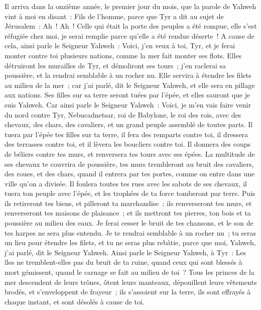\begin{multicols}{2}
\VerseOne{}Il arriva dans la onzième année, le premier jour du mois, que la parole de Yahweh vint à moi en disant~:
Fils de l'homme, parce que Tyr a dit au sujet de Jérusalem~: Ah~! Ah~! Celle qui était la porte des peuples a été rompue, elle s'est réfugiée chez moi, je serai remplie parce qu'elle a été rendue déserte~!
A cause de cela, ainsi parle le Seigneur Yahweh~: Voici, j'en veux à toi, Tyr, et je ferai monter contre toi plusieurs nations, comme la mer fait monter ses flots.
Elles détruiront les murailles de Tyr, et démoliront ses tours~; j'en raclerai sa poussière, et la rendrai semblable à un rocher nu.
Elle servira à étendre les filets au milieu de la mer~; car j'ai parlé, dit le Seigneur Yahweh, et elle sera en pillage aux nations.
Ses filles sur sa terre seront tuées par l'épée, et elles sauront que je suis Yahweh.
Car ainsi parle le Seigneur Yahweh~: Voici, je m'en vais faire venir du nord contre Tyr, Nebucadnetsar, roi de Babylone, le roi des rois, avec des chevaux, des chars, des cavaliers, et un grand peuple assemblé de toutes parts.
Il tuera par l'épée tes filles sur ta terre, il fera des remparts contre toi, il dressera des terrasses contre toi, et il lèvera les boucliers contre toi.
Il donnera des coups de béliers contre tes murs, et renversera tes tours avec ses épées.
La multitude de ses chevaux te couvrira de poussière, tes murs trembleront au bruit des cavaliers, des roues, et des chars, quand il entrera par tes portes, comme on entre dans une ville qu'on a divisée.
Il foulera toutes tes rues avec les sabots de ses chevaux, il tuera ton peuple avec l'épée, et les trophées de ta force tomberont par terre.
Puis ils retireront tes biens, et pilleront ta marchandise~; ils renverseront tes murs, et renverseront tes maisons de plaisance~; et ils mettront tes pierres, ton bois et ta poussière au milieu des eaux.
Je ferai cesser le bruit de tes chansons, et le son de tes harpes ne sera plus entendu.
Je te rendrai semblable à un rocher nu~; tu seras un lieu pour étendre les filets, et tu ne seras plus rebâtie, parce que moi, Yahweh, j'ai parlé, dit le Seigneur Yahweh.
Ainsi parle le Seigneur Yahweh, à Tyr~: Les îles ne tremblent-elles pas du bruit de ta ruine, quand ceux qui sont blessés à mort gémissent, quand le carnage se fait au milieu de toi~?
Tous les princes de la mer descendent de leurs trônes, ôtent leurs manteaux, dépouillent leurs vêtements brodés, et s'enveloppent de frayeur~; ils s'assoient sur la terre, ils sont effrayés à chaque instant, et sont désolés à cause de toi.

\end{multicols}
